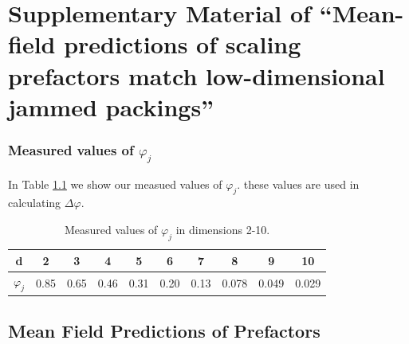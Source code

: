 


%
\chapter{Supplementary Material of ``Mean-field predictions of scaling prefactors match low-dimensional jammed packings''}
\author{James D Sartor$^*$, Sean A. Ridout$^\dagger$, Eric I. Corwin$^*$}

\label{excessContactsScalingSupplement}

\subsection{Measured values of $\varphi_j$}
In Table \ref{table:phij} we show our measued values of $\varphi_j$. these values are used in calculating $\Delta \varphi$.

\begin{table}[ht]
\caption{Measured values of $\varphi_j$ in dimensions 2-10.
\label{table:phij}}
\begin{tabular}{ |c|c|c|c|c|c|c|c|c|c| } 
 \hline
 d & 2 & 3 & 4 & 5 & 6 & 7 & 8 & 9 & 10 \\ 
 \hline
 $\varphi_j$ & 0.85 & 0.65 & 0.46 & 0.31 & 0.20 & 0.13 & 0.078 & 0.049 & 0.029\\ 
 \hline
\end{tabular}
\end{table}

\section{Mean Field Predictions of Prefactors}

